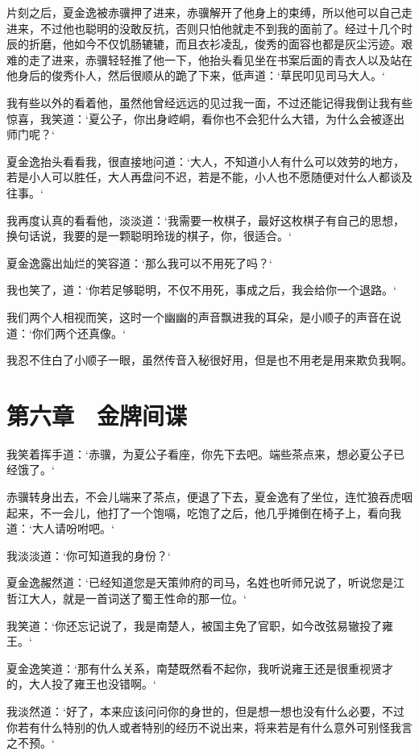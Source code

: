 片刻之后，夏金逸被赤骥押了进来，赤骥解开了他身上的束缚，所以他可以自己走进来，不过他也聪明的没敢反抗，否则只怕他就走不到我的面前了。经过十几个时辰的折磨，他如今不仅饥肠辘辘，而且衣衫凌乱，俊秀的面容也都是灰尘污迹。艰难的走了进来，赤骥轻轻推了他一下，他抬头看见坐在书案后面的青衣人以及站在他身后的俊秀仆人，然后很顺从的跪了下来，低声道：‘草民叩见司马大人。‘

我有些以外的看着他，虽然他曾经远远的见过我一面，不过还能记得我倒让我有些惊喜，我笑道：‘夏公子，你出身崆峒，看你也不会犯什么大错，为什么会被逐出师门呢？‘

夏金逸抬头看看我，很直接地问道：‘大人，不知道小人有什么可以效劳的地方，若是小人可以胜任，大人再盘问不迟，若是不能，小人也不愿随便对什么人都谈及往事。‘

我再度认真的看看他，淡淡道：‘我需要一枚棋子，最好这枚棋子有自己的思想，换句话说，我要的是一颗聪明玲珑的棋子，你，很适合。‘

夏金逸露出灿烂的笑容道：‘那么我可以不用死了吗？‘

我也笑了，道：‘你若足够聪明，不仅不用死，事成之后，我会给你一个退路。‘

我们两个人相视而笑，这时一个幽幽的声音飘进我的耳朵，是小顺子的声音在说道：‘你们两个还真像。‘

我忍不住白了小顺子一眼，虽然传音入秘很好用，但是也不用老是用来欺负我啊。

\chapter{第六章　金牌间谍}

我笑着挥手道：‘赤骥，为夏公子看座，你先下去吧。端些茶点来，想必夏公子已经饿了。‘

赤骥转身出去，不会儿端来了茶点，便退了下去，夏金逸有了坐位，连忙狼吞虎咽起来，不一会儿，他打了一个饱嗝，吃饱了之后，他几乎摊倒在椅子上，看向我道：‘大人请吩咐吧。‘

我淡淡道：‘你可知道我的身份？‘

夏金逸赧然道：‘已经知道您是天策帅府的司马，名姓也听师兄说了，听说您是江哲江大人，就是一首词送了蜀王性命的那一位。‘

我笑道：‘你还忘记说了，我是南楚人，被国主免了官职，如今改弦易辙投了雍王。‘

夏金逸笑道：‘那有什么关系，南楚既然看不起你，我听说雍王还是很重视贤才的，大人投了雍王也没错啊。‘

我淡然道：‘好了，本来应该问问你的身世的，但是想一想也没有什么必要，不过你若有什么特别的仇人或者特别的经历不说出来，将来若是有什么意外可别怪我言之不预。‘

